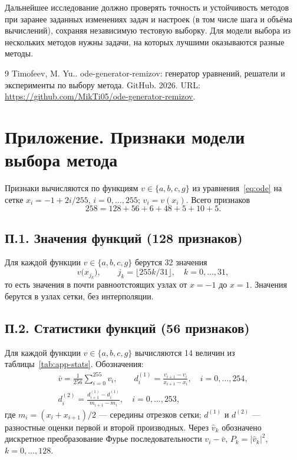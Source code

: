 \documentclass[14pt,a4paper]{extarticle}
\begin{document}
Дальнейшее исследование должно проверять точность и устойчивость методов
при заранее заданных изменениях задач и настроек (в том числе шага
и объёма вычислений), сохраняя независимую тестовую выборку. Для модели
выбора из нескольких методов нужны задачи, на которых лучшими
оказываются разные методы.

\clearpage
\renewcommand{\refname}{Список использованных источников}
{}
\begin{thebibliography}{9}
 Timofeev, M. Yu.. ode-generator-remizov: генератор уравнений, решатели и эксперименты по выбору метода. GitHub. 2026. URL: \url{https://github.com/MikTi05/ode-generator-remizov}.

\end{thebibliography}

\clearpage
\section*{Приложение. Признаки модели выбора метода}
{}

Признаки вычисляются по функциям $v\in\{a,b,c,g\}$ из
уравнения~\eqref{eq:ode} на сетке $x_i=-1+2i/255$, $i=0,\dots,255$;
$v_i=v(x_i)$. Всего признаков
\[
258=128+56+6+48+5+10+5.
\]

\subsection*{П.1. Значения функций (128 признаков)}
Для каждой функции $v\in\{a,b,c,g\}$ берутся 32 значения
\[
v\bigl(x_{j_k}\bigr),\qquad j_k=\lfloor 255k/31\rfloor,\quad k=0,\dots,31,
\]
то есть значения в почти равноотстоящих узлах от $x=-1$ до $x=1$.
Значения берутся в узлах сетки, без интерполяции.

\subsection*{П.2. Статистики функций (56 признаков)}
Для каждой функции $v\in\{a,b,c,g\}$ вычисляются 14 величин из
таблицы~\ref{tab:app-stats}. Обозначения:
\begin{gather*}
\bar v=\frac1{256}\sum_{i=0}^{255}v_i,\qquad
d^{(1)}_i=\frac{v_{i+1}-v_i}{x_{i+1}-x_i},\quad i=0,\dots,254,\\
d^{(2)}_i=\frac{d^{(1)}_{i+1}-d^{(1)}_i}{m_{i+1}-m_i},\quad i=0,\dots,253,
\end{gather*}
где $m_i=(x_i+x_{i+1})/2$ --- середины отрезков сетки;
$d^{(1)}$ и $d^{(2)}$ --- разностные оценки первой и второй производных.
Через $\hat v_k$ обозначено дискретное преобразование Фурье
последовательности $v_i-\bar v$, $P_k=|\hat v_k|^2$, $k=0,\dots,128$.
\end{document}
